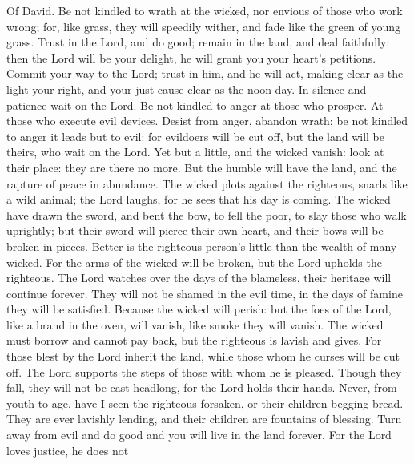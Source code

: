 Of David.  Be not kindled to wrath at the wicked, nor
envious of those who work wrong;  for, like grass, they will
speedily wither, and fade like the green of young grass. 
Trust in the Lord, and do good; remain in the land, and deal faithfully:
 then the Lord will be your delight, he will grant you your
heart's petitions.  Commit your way to the Lord; trust in
him, and he will act,  making clear as the light your right,
and your just cause clear as the noon-day.  In silence and
patience wait on the Lord. Be not kindled to anger at those who prosper.
At those who execute evil devices.  Desist from anger,
abandon wrath: be not kindled to anger it leads but to evil:
 for evildoers will be cut off, but the land will be theirs,
who wait on the Lord.  Yet but a little, and the wicked
vanish: look at their place: they are there no more.  But
the humble will have the land, and the rapture of peace in abundance.
 The wicked plots against the righteous, snarls like a wild
animal;  the Lord laughs, for he sees that his day is
coming.  The wicked have drawn the sword, and bent the bow,
to fell the poor, to slay those who walk uprightly;  but
their sword will pierce their own heart, and their bows will be broken
in pieces.  Better is the righteous person's little than
the wealth of many wicked.  For the arms of the wicked will
be broken, but the Lord upholds the righteous.  The Lord
watches over the days of the blameless, their heritage will continue
forever.  They will not be shamed in the evil time, in the
days of famine they will be satisfied.  Because the wicked
will perish: but the foes of the Lord, like a brand in the oven, will
vanish, like smoke they will vanish.  The wicked must
borrow and cannot pay back, but the righteous is lavish and gives.
 For those blest by the Lord inherit the land, while those
whom he curses will be cut off.  The Lord supports the
steps of those with whom he is pleased.  Though they fall,
they will not be cast headlong, for the Lord holds their hands.
 Never, from youth to age, have I seen the righteous
forsaken, or their children begging bread.  They are ever
lavishly lending, and their children are fountains of blessing.
 Turn away from evil and do good and you will live in the
land forever.  For the Lord loves justice, he does not
